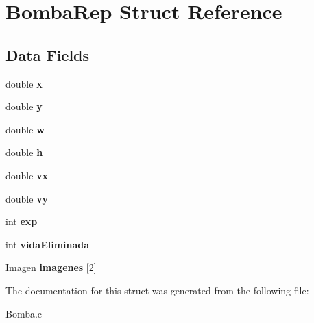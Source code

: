 \hypertarget{struct_bomba_rep}{}\section{Bomba\+Rep Struct Reference}
\label{struct_bomba_rep}
\subsection*{Data Fields}
\begin{DoxyCompactItemize}
\item 
\mbox{\label{struct_bomba_rep_a14865d5c576248d6c50dd0f7d8c7ca0a}} 
double {\bfseries x}
\item 
\mbox{\label{struct_bomba_rep_a8aba7615e7bfe747c9e0e501dd1a10e0}} 
double {\bfseries y}
\item 
\mbox{\label{struct_bomba_rep_a96bfe6d72f520069c842bea0547d02d6}} 
double {\bfseries w}
\item 
\mbox{\label{struct_bomba_rep_a38aae20808cd8420a91e960b2a1b2398}} 
double {\bfseries h}
\item 
\mbox{\label{struct_bomba_rep_abb608dee26680cd27cc2cb6c30c28101}} 
double {\bfseries vx}
\item 
\mbox{\label{struct_bomba_rep_a3e2c516033df2704aae8d42ad0b7aba6}} 
double {\bfseries vy}
\item 
\mbox{\label{struct_bomba_rep_a8181c644f362682c1775992fe9bde940}} 
int {\bfseries exp}
\item 
\mbox{\label{struct_bomba_rep_a22764b5910e80a4d792f6af2ab66f4a7}} 
int {\bfseries vida\+Eliminada}
\item 
\mbox{\label{struct_bomba_rep_aa0a979375d1954dcb00a439173ba5b5f}} 
\mbox{\hyperlink{_pantalla_8h_a768e3409329f2389c63495f1a1684379}{Imagen}} {\bfseries imagenes} \mbox{[}2\mbox{]}
\end{DoxyCompactItemize}


The documentation for this struct was generated from the following file\+:\begin{DoxyCompactItemize}
\item 
Bomba.\+c\end{DoxyCompactItemize}

